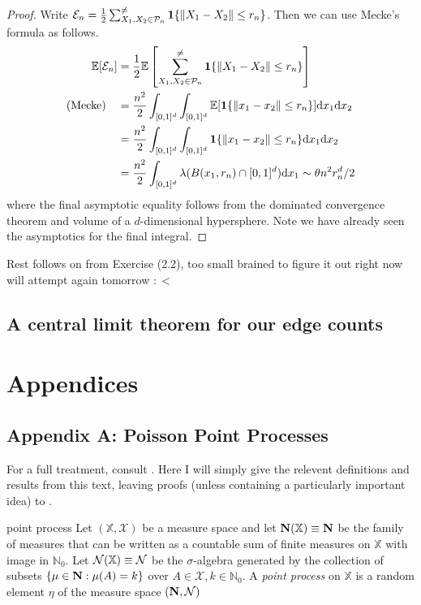 \documentclass{article}
\begin{document}
\begin{proof}
Write $\mathcal{E}_n = \frac{1}{2}\sum_{X_1, X_2 \in \mathcal{P}_n}^{\neq}{\bf 1}\{\lVert X_1 - X_2 \rVert \leq r_n\}$. Then 
we can use Mecke's formula as follows. 
\begin{align*}
    \mathbb{E}[\mathcal{E}_n] &= \frac{1}{2}\mathbb{E}\left[\sum_{X_1, X_2 \in \mathcal{P}_n}^{\neq}{\bf 1}\{\lVert X_1 - X_2 \rVert \leq r_n\}\right] \\
    (\text{Mecke}) \quad &= \frac{n^2}{2}\int_{[0,1]^d}\int_{[0,1]^d}\mathbb{E}[{\bf 1}\{\lVert x_1 - x_2 \rVert \leq r_n\}]\mathrm{d}x_1\mathrm{d}x_2 \\
    &= \frac{n^2}{2}\int_{[0,1]^d}\int_{[0,1]^d}{\bf 1}\{\lVert x_1 - x_2 \rVert \leq r_n\}\mathrm{d}x_1\mathrm{d}x_2 \\
    &= \frac{n^2}{2}\int_{[0,1]^d}\lambda(B(x_1, r_n) \cap [0,1]^d)\mathrm{d}x_1 \sim \theta n^2 r_n^d / 2
\end{align*}
where the final asymptotic equality follows from the dominated convergence theorem and volume of a $d$-dimensional 
hypersphere. Note we have already seen the asymptotics for the final integral.
\end{proof}

Rest follows on from Exercise (2.2), too small brained to figure it out right now will attempt again tomorrow $:<$

\subsection{A central limit theorem for our edge counts}

\newpage

\section{Appendices}

\subsection{Appendix A: Poisson Point Processes}

For a full treatment, consult \cite{Last_Penrose_2017}. Here I will simply give the relevent definitions and 
results from this text, leaving proofs (unless containing a particularly important idea) to \cite{Last_Penrose_2017}.

\begin{definition}[]{point process}
    Let $(\mathbb{X}, \mathcal{X})$ be a measure space and let ${\bf N}(\mathbb{X}) \equiv {\bf N}$ be the family 
    of measures that can be written as a countable sum of finite measures on $\mathbb{X}$ with image in $\mathbb{N}_0$. 
    Let ${\bf \mathcal{N}}(\mathbb{X}) \equiv {\bf \mathcal{N}}$ be the $\sigma$-algebra generated by the collection 
    of subsets $\{\mu \in {\bf N} : \mu(A) = k\}$ over $A \in \mathcal{X}, k \in \mathbb{N}_0$. A {\it point process}
    on $\mathbb{X}$ is a random element $\eta$ of the measure space $({\bf N}, {\bf \mathcal{N}})$
\end{definition}
\end{document}
